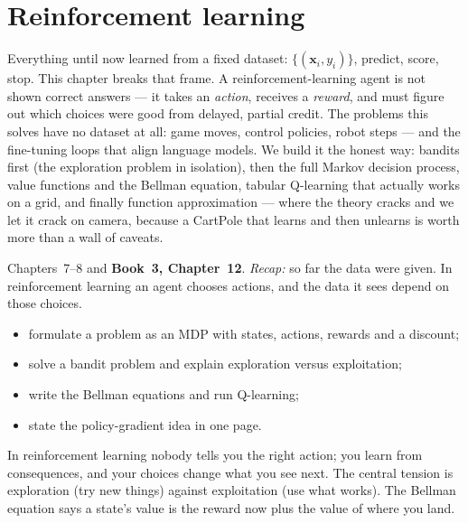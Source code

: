 \chapter{Reinforcement learning}
\label{ch:rl}

Everything until now learned from a fixed dataset: $\{(\mathbf x_i,
y_i)\}$, predict, score, stop. This chapter breaks that frame. A
reinforcement-learning agent is not shown correct answers --- it takes
an \emph{action}, receives a \emph{reward}, and must figure out which
choices were good from delayed, partial credit. The problems this
solves have no dataset at all: game moves, control policies, robot
steps --- and the fine-tuning loops that align language models. We
build it the honest way: bandits first (the exploration problem in
isolation), then the full Markov decision process, value functions and
the Bellman equation, tabular Q-learning that actually works on a
grid, and finally function approximation --- where the theory cracks
and we let it crack on camera, because a CartPole that learns and
then unlearns is worth more than a wall of caveats.

\begin{rulebox}
Chapters~7--8 and \textbf{Book~3, Chapter~12}. \emph{Recap:} so far the data were given. In reinforcement learning an agent chooses actions, and the data it sees depend on those choices.
\end{rulebox}
\begin{wins}
\begin{itemize}
\item formulate a problem as an MDP with states, actions, rewards and a discount;
\item solve a bandit problem and explain exploration versus exploitation;
\item write the Bellman equations and run Q-learning;
\item state the policy-gradient idea in one page.
\end{itemize}
\end{wins}
\begin{principle}
In reinforcement learning nobody tells you the right action; you learn from consequences, and your choices change what you see next. The central tension is exploration (try new things) against exploitation (use what works). The Bellman equation says a state's value is the reward now plus the value of where you land.
\end{principle}

